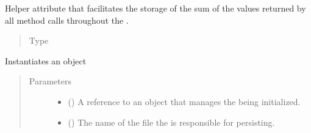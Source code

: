 \documentclass[letterpaper,10pt,english]{sphinxmanual}
\begin{document}
\begin{fulllineitems}
\begin{fulllineitems}
\label{\detokenize{app.domain:app.domain.cluster_groups.Cluster._recovery_epoch_calls}}
Helper attribute that facilitates the storage of the sum of the
values returned by all
method calls throughout the {\hyperref[\detokenize{app.domain:app.domain.cluster_groups.Cluster.current_epoch}]{}}.
\begin{quote}\begin{description}
\item[{Type}] \leavevmode
{}

\end{description}\end{quote}

\end{fulllineitems}


\begin{fulllineitems}
\label{\detokenize{app.domain:app.domain.cluster_groups.Cluster.__init__}}
Instantiates an  object
\begin{quote}\begin{description}
\item[{Parameters}] \leavevmode\begin{itemize}
\item {} 
 ({\hyperref[\detokenize{app:app.type_hints.MasterType}]{}}) \textendash{} A reference to an {\hyperref[\detokenize{app.domain:app.domain.master_servers.Master}]{}}
object that manages the  being initialized.

\item {} 
 () \textendash{} The name of the file the  is responsible for
persisting.


\end{itemize}
\end{description}
\end{quote}
\end{fulllineitems}
\end{fulllineitems}
\end{document}
